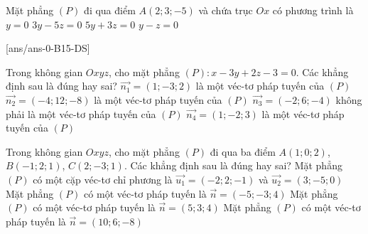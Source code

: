 \begin{ex}%
	Mặt phẳng $(P)$ đi qua điểm $A(2;3;-5)$ và chứa trục $Ox$ có phương trình là
	\choice 
	{$y = 0$}
	{$3y - 5z = 0$}
	{\True $5y + 3z = 0$}
	{$y - z = 0$}
\end{ex}


\cauds
{}[ans/ans-0-B15-DS]

\begin{ex}%
	Trong không gian $Oxyz$, cho mặt phẳng $(P)\colon x-3y+2z-3=0$. Các khẳng định sau là đúng hay sai?
	\choiceTF
	{\True $\vec{n_1}=(1;-3;2)$ là một véc-tơ pháp tuyến của $(P)$}
	{\True $\vec{n_2}=(-4;12;-8)$ là một véc-tơ pháp tuyến của $(P)$}
	{\True $\vec{n_3}=(-2;6;-4)$ không phải là một véc-tơ pháp tuyến của $(P)$}
	{$\vec{n_4}=(1;-2;3)$ là một véc-tơ pháp tuyến của $(P)$}
\end{ex}
\begin{ex}%
	Trong không gian $Oxyz$, cho mặt phẳng $(P)$ đi qua ba điểm $A(1;0;2)$, $B(-1;2;1)$, $C(2;-3;1)$. Các khẳng định sau là đúng hay sai?
	\choiceTF
	{\True Mặt phẳng $(P)$ có một cặp véc-tơ chỉ phương là $\vec{u_1}=(-2;2;-1)$ và $\vec{u_2}=(3;-5;0)$}
	{\True Mặt phẳng $(P)$ có một véc-tơ pháp tuyến là $\vec{n}=(-5;-3;4)$}
	{Mặt phẳng $(P)$ có một véc-tơ pháp tuyến là $\vec{n}=(5;3;4)$}
	{\True Mặt phẳng $(P)$ có một véc-tơ pháp tuyến là $\vec{n}=(10;6;-8)$}
\end{ex}


